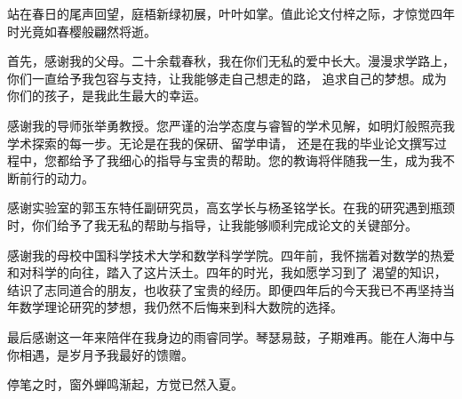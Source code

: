 
\begin{acknowledgements}

站在春日的尾声回望，庭梧新绿初展，叶叶如掌。值此论文付梓之际，才惊觉四年时光竟如春樱般翩然将逝。

首先，感谢我的父母。二十余载春秋，我在你们无私的爱中长大。漫漫求学路上，你们一直给予我包容与支持，让我能够走自己想走的路，
追求自己的梦想。成为你们的孩子，是我此生最大的幸运。

感谢我的导师张举勇教授。您严谨的治学态度与睿智的学术见解，如明灯般照亮我学术探索的每一步。无论是在我的保研、留学申请，
还是在我的毕业论文撰写过程中，您都给予了我细心的指导与宝贵的帮助。您的教诲将伴随我一生，成为我不断前行的动力。

感谢实验室的郭玉东特任副研究员，高玄学长与杨圣铭学长。在我的研究遇到瓶颈时，你们给予了我无私的帮助与指导，让我能够顺利完成论文的关键部分。

感谢我的母校中国科学技术大学和数学科学学院。四年前，我怀揣着对数学的热爱和对科学的向往，踏入了这片沃土。四年的时光，我如愿学习到了
渴望的知识，结识了志同道合的朋友，也收获了宝贵的经历。即便四年后的今天我已不再坚持当年数学理论研究的梦想，我仍然不后悔来到科大数院的选择。

最后感谢这一年来陪伴在我身边的雨睿同学。琴瑟易鼓，子期难再。能在人海中与你相遇，是岁月予我最好的馈赠。

停笔之时，窗外蝉鸣渐起，方觉已然入夏。

\end{acknowledgements}
